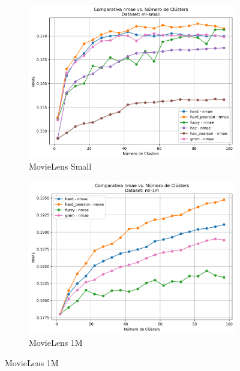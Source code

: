 \documentclass[a4paper,12pt]{report}
\begin{document}
\begin{figure}[H]
    \centering
    \begin{subfigure}[b]{0.49\textwidth}
        \includegraphics[width=\textwidth]{Figuras/FinalResults/nmae-pear-ml-small.png}
        \caption{MovieLens Small}
        \label{fig:nmae-ml-small-a}
    \end{subfigure}
    \hfill
    \begin{subfigure}[b]{0.49\textwidth}
        \includegraphics[width=\textwidth]{Figuras/FinalResults/nmae-pear-ml-1m.png}
        \caption{MovieLens 1M}
        \label{fig:nmae-ml-1m-b}
    \end{subfigure}

    \vspace{1em}


\end{figure}
\end{document}
